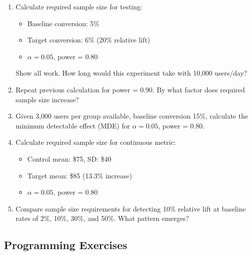 \begin{enumerate}
    \item Calculate required sample size for testing:
    \begin{itemize}
        \item Baseline conversion: 5\%
        \item Target conversion: 6\% (20\% relative lift)
        \item $\alpha = 0.05$, power = 0.80
    \end{itemize}
    Show all work. How long would this experiment take with 10,000 users/day?

    \item Repeat previous calculation for power = 0.90. By what factor does required sample size increase?

    \item Given 3,000 users per group available, baseline conversion 15\%, calculate the minimum detectable effect (MDE) for $\alpha = 0.05$, power = 0.80.

    \item Calculate required sample size for continuous metric:
    \begin{itemize}
        \item Control mean: \$75, SD: \$40
        \item Target mean: \$85 (13.3\% increase)
        \item $\alpha = 0.05$, power = 0.80
    \end{itemize}

    \item Compare sample size requirements for detecting 10\% relative lift at baseline rates of 2\%, 10\%, 30\%, and 50\%. What pattern emerges?
\end{enumerate}

\subsection{Programming Exercises}

